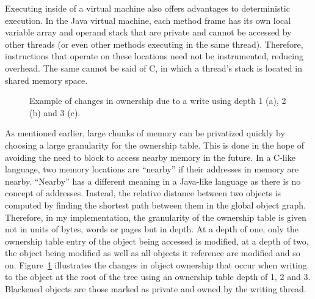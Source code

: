 Executing inside of a virtual machine also offers advantages to
deterministic execution.  In the Java virtual machine, each method
frame has its own local variable array and operand stack that are
private and cannot be accessed by other threads (or even other methods
executing in the same thread).  Therefore, instructions that operate
on these locations need not be instrumented, reducing overhead.  The
same cannot be said of C, in which a thread's stack is located in
shared memory space.

\begin{figure}[!]
  \begin{center}
    {}
  \end{center}
  \caption{Example of changes in ownership due to a write using depth 1 (a), 2
    (b) and 3 (c).}
  \label{fig:depth}
\end{figure}

As mentioned earlier, large chunks of memory can be privatized quickly
by choosing a large granularity for the ownership table.  This is done
in the hope of avoiding the need to block to access nearby memory in
the future.  In a C-like language, two memory locations are ``nearby''
if their addresses in memory are nearby.  ``Nearby'' has a different
meaning in a Java-like language as there is no concept of addresses.
Instead, the relative distance between two objects is computed by
finding the shortest path between them in the global object graph.
Therefore, in my implementation, the granularity of the ownership
table is given not in units of bytes, words or pages but in depth.  At
a depth of one, only the ownership table entry of the object being
accessed is modified, at a depth of two, the object being modified as
well as all objects it reference are modified and so on.
Figure~\ref{fig:depth} illustrates the changes in object ownership
that occur when writing to the object at the root of the tree using an
ownership table depth of 1, 2 and 3.  Blackened objects are those
marked as private and owned by the writing thread.

